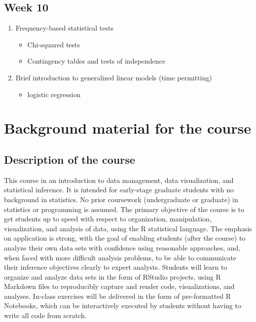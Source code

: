 \documentclass[]{book}
\providecommand{\tightlist}{%
  \setlength{\itemsep}{0pt}\setlength{\parskip}{0pt}}
\begin{document}
\hypertarget{week-10}{%
\section{Week 10}\label{week-10}}

\begin{enumerate}
\def\labelenumi{\arabic{enumi}.}
\tightlist
\item
  Frequency-based statistical tests

  \begin{itemize}
  \tightlist
  \item
    Chi-squared tests
  \item
    Contingency tables and tests of independence
  \end{itemize}
\item
  Brief introduction to generalized linear models (time permitting)

  \begin{itemize}
  \tightlist
  \item
    logistic regression
  \end{itemize}
\end{enumerate}

\hypertarget{background-material-for-the-course}{%
\chapter{Background material for the course}\label{background-material-for-the-course}}

\hypertarget{description-of-the-course}{%
\section{Description of the course}\label{description-of-the-course}}

This course in an introduction to data management, data visualization, and statistical
inference. It is intended for early-stage graduate students with no background in
statistics. No prior coursework (undergraduate or graduate) in statistics or
programming is assumed. The primary objective of the course is to get students up to
speed with respect to organization, manipulation, visualization, and analysis of data,
using the R statistical language. The emphasis on application is strong, with the goal
of enabling students (after the course) to analyze their own data sets with confidence
using reasonable approaches, and, when faced with more difficult analysis problems,
to be able to communicate their inference objectives clearly to expert analysts.
Students will learn to organize and analyze data sets in the form of RStudio projects,
using R Markdown files to reproducibly capture and render code, visualizations, and
analyses. In-class exercises will be delivered in the form of pre-formatted R
Notebooks, which can be interactively executed by students without having to write
all code from scratch.
\end{document}
